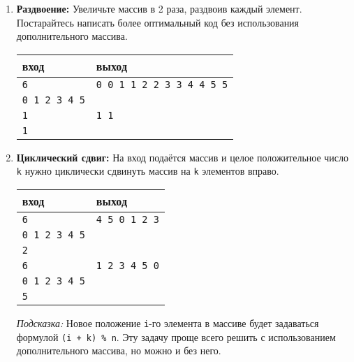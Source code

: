 \documentclass{article}
\begin{document}
\begin{enumerate}
\item \textbf{Раздвоение:} Увеличьте массив в 2 раза, раздвоив каждый элемент. Постарайтесь написать более оптимальный код без использования дополнительного массива.
\begin{center}
\begin{tabular}{ l | l }
 вход & выход \\ \hline
 \texttt{6} & \texttt{0 0 1 1 2 2 3 3 4 4 5 5}  \\  
 \texttt{0 1 2 3 4 5} & \\ \hline
 \texttt{1} & \texttt{1 1}  \\  
 \texttt{1} &  \\
\end{tabular}
\end{center}
\item \textbf{Циклический сдвиг:} На вход подаётся массив и целое положительное число \texttt{k} нужно циклически сдвинуть массив на \texttt{k} элементов вправо.
\begin{center}
\begin{tabular}{ l | l }
 вход & выход \\ \hline
 \texttt{6} & \texttt{4 5 0 1 2 3}  \\  
 \texttt{0 1 2 3 4 5} & \\
 \texttt{2} & \\ \hline
 \texttt{6} & \texttt{1 2 3 4 5 0}  \\  
 \texttt{0 1 2 3 4 5} & \\
 \texttt{5} & \\ 
\end{tabular}
\end{center}
\textit{Подсказка:} Новое положение \texttt{i}-го элемента в массиве будет задаваться формулой \texttt{(i + k) \% n}. Эту задачу проще всего решить с использованием дополнительного массива, но можно и без него.
\end{enumerate}
\end{document}

